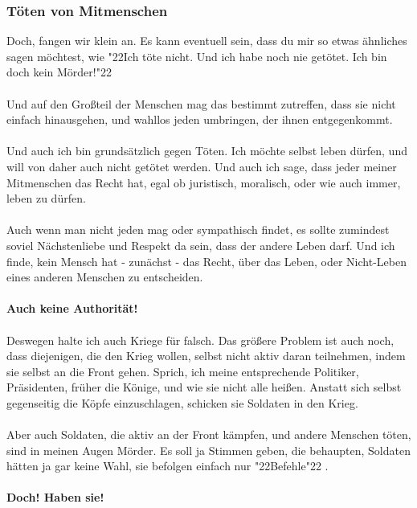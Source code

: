 \documentclass[12pt,a5paper]{article}
\newcommand{\q}[1]{\char"22{#1}\char"22 }
\begin{document}
	\subsubsection{T\"oten von Mitmenschen}
		Doch, fangen wir klein an.
		Es kann eventuell sein,
		dass du mir so etwas \"ahnliches sagen m\"ochtest,
		wie \q{Ich t\"ote nicht.
		Und ich habe noch nie get\"otet.
		Ich bin doch kein M\"order!}
		\\
		\\
		Und auf den Gro{\ss}teil der Menschen mag das bestimmt zutreffen,
		dass sie nicht einfach hinausgehen,
		und wahllos jeden umbringen,
		der ihnen entgegenkommt.
		\\
		\\
		Und auch ich bin grunds\"atzlich gegen T\"oten.
		Ich m\"ochte selbst leben d\"urfen,
		und will von daher auch nicht get\"otet werden.
		Und auch ich sage,
		dass jeder meiner Mitmenschen das Recht hat,
		egal ob juristisch,
		moralisch,
		oder wie auch immer,
		leben zu d\"urfen.
		\\
		\\
		Auch wenn man nicht jeden mag oder sympathisch findet,
		es sollte zumindest soviel N\"achstenliebe und Respekt da sein,
		dass der andere Leben darf.
		Und ich finde,
		kein Mensch hat - zun\"achst - das Recht,
		\"uber das Leben,
		oder Nicht-Leben eines anderen Menschen zu entscheiden.
		\\
		\\
		\textbf{Auch keine Authorit\"at!}
		\\
		\\
		Deswegen halte ich auch Kriege f\"ur falsch.
		Das gr\"o{\ss}ere Problem ist auch noch,
		dass diejenigen,
		die den Krieg wollen,
		selbst nicht aktiv daran teilnehmen,
		indem sie selbst an die Front gehen.
		Sprich,
		ich meine entsprechende Politiker,
		Pr\"asidenten,
		fr\"uher die K\"onige,
		und wie sie nicht alle hei{\ss}en.
		Anstatt sich selbst gegenseitig die K\"opfe einzuschlagen,
		schicken sie Soldaten in den Krieg.
		\\
		\\
		Aber auch Soldaten,
		die aktiv an der Front k\"ampfen,
		und andere Menschen t\"oten,
		sind in meinen Augen M\"order.
		Es soll ja Stimmen geben,
		die behaupten,
		Soldaten h\"atten ja gar keine Wahl,
		sie befolgen einfach nur \q{Befehle}.
		\\
		\\
		\textbf{Doch!
		Haben sie!}
		\\
		\\
\end{document}
